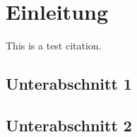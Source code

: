 \thispagestyle{plain}

\section{Einleitung}\label{intro}

\lipsum[1]

This is a test citation\cite{cry:2011}.

\subsection{Unterabschnitt 1}\label{intro:subsection1}

\lipsum[2]

\subsection{Unterabschnitt 2}\label{intro:subsection2}

\lipsum[3]